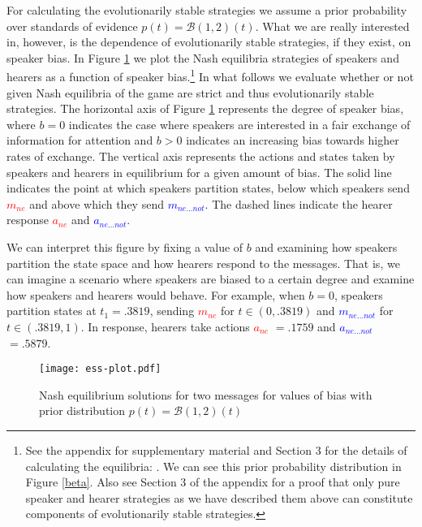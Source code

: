 \documentclass[linguex]{sp}
\theoremstyle{definition} \newtheorem{definition}{Definition}
\begin{document}
For calculating the evolutionarily stable strategies we assume a prior probability over standards of evidence $p(t) = \mathcal{B}(1,2)(t)$.  What we are really interested in, however, is the dependence of evolutionarily stable strategies, if they exist, on speaker bias. In Figure \ref{ess-plot} we plot the Nash equilibria strategies of speakers and hearers as a function of speaker bias.\footnote{See the appendix for supplementary material and Section 3 for the details of calculating the equilibria: . We can see this prior probability distribution in Figure \ref{beta}. Also see Section 3 of the appendix for a proof that only pure speaker and hearer strategies as we have described them above can constitute components of evolutionarily stable strategies.}  In what follows we evaluate whether or not given Nash equilibria of the game are strict and thus evolutionarily stable strategies. The horizontal axis of Figure \ref{ess-plot} represents the degree of speaker bias, where $b=0$ indicates the case where speakers are interested in a fair exchange of information for attention and $b > 0$ indicates an increasing bias towards higher rates of exchange. The vertical axis represents the actions and states taken by speakers and hearers in equilibrium for a given amount of bias. The solid line indicates the point at which speakers partition states, below which speakers send \emph{\textcolor{red}{$m_{ne}$}} and above which they send \emph{\textcolor{blue}{$m_{ne...not}$}}. The dashed lines indicate the hearer response \emph{\textcolor{red}{$a_{ne}$}} and \emph{\textcolor{blue}{$a_{ne...not}$}}.  

We can interpret this figure by fixing a value of $b$ and examining how speakers partition the state space and how hearers respond to the messages.  That is, we can imagine a scenario where speakers are biased to a certain degree and examine how speakers and hearers would behave. For example, when $b=0$, speakers partition states at $t_1 = .3819$, sending \emph{\textcolor{red}{$m_{ne}$}} for $t \in (0, .3819)$ and \emph{\textcolor{blue}{$m_{ne...not}$}} for $t \in (.3819, 1)$. In response, hearers take actions \emph{\textcolor{red}{$a_{ne}$}} $=.1759$ and \emph{\textcolor{blue}{$a_{ne...not}$}} $ =.5879$. 

\begin{figure}
\begin{center}
	\texttt{[image: ess-plot.pdf]}
	\caption{Nash equilibrium solutions for two messages for values of bias with prior distribution $p(t) = \mathcal{B}(1,2)(t)$}
	\label{ess-plot}
\end{center}
\end{figure}
\end{document}
